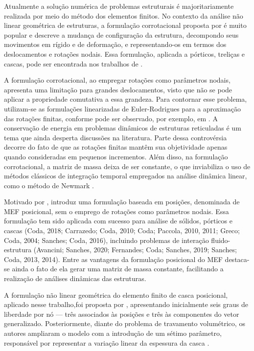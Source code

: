 Atualmente a solução numérica de problemas estruturais é majoritariamente realizada por meio do método dos elementos finitos. No contexto da análise não linear geométrica de estruturas, a formulação corrotacional proposta por  é muito popular e descreve a mudança de configuração da estrutura, decompondo seus movimentos em rígido e de deformação, e representando-os em termos dos deslocamentos e rotações nodais. Essa formulação, aplicada a pórticos, treliças e cascas, pode ser encontrada nos trabalhos de .

A formulação corrotacional, ao empregar rotações como parâmetros nodais, apresenta uma limitação para grandes deslocamentos, visto que não se pode aplicar a propriedade comutativa a essa grandeza. Para contornar esse problema, utilizam-se as formulações linearizadas de Euler-Rodrigues para a aproximação das rotações finitas, conforme pode ser observado, por exemplo, em . A conservação de energia em problemas dinâmicos de estruturas reticuladas é um tema que ainda desperta discussões na literatura. Parte dessa controvérsia decorre do fato de que as rotações finitas mantêm sua objetividade apenas quando consideradas em pequenos incrementos. Além disso, na formulação corrotacional, a matriz de massa deixa de ser constante, o que inviabiliza o uso de métodos clássicos de integração temporal empregados na análise dinâmica linear, como o método de Newmark  \cite{SanchesC:2013}.

Motivado por ,  introduz uma formulação baseada em posições, denominada de MEF posicional, sem o emprego de rotações como parâmetros nodais. Essa formulação tem sido aplicada com sucesso para análise de sólidos, pórticos e cascas (Coda, 2018; Carrazedo;
Coda, 2010; Coda; Paccola, 2010, 2011; Greco; Coda, 2004; Sanches;
Coda, 2016), incluindo problemas de interação fluido-estrutura (Avancini; Sanches, 2020;
Fernandes; Coda; Sanches, 2019; Sanches; Coda, 2013, 2014). Entre as vantagens da formulação posicional do MEF destaca-se ainda o fato de ela gerar uma matriz de massa constante, facilitando a realização de análises dinâmicas das estruturas.

A formulação não linear geométrica do elemento finito de casca posicional, aplicado nesse trabalho,foi proposta por \cite{CodaP:2007}, apresentando inicialmente seis graus de liberdade por nó — três associados às posições e três às componentes do vetor generalizado. Posteriormente, diante do problema de travamento volumétrico, os autores ampliaram o modelo com a introdução de um sétimo parâmetro, responsável por representar a variação linear da espessura da casca \cite{CodaP:2008}.

